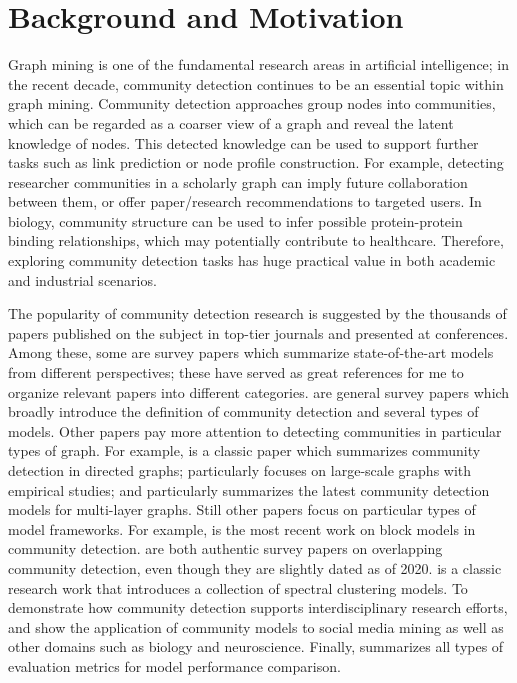 \section{Background and Motivation}
Graph mining is one of the fundamental research areas in artificial intelligence; in the recent decade, community detection continues to be an essential topic within graph mining. Community detection approaches group nodes into communities, which can be regarded as a coarser view of a graph and reveal the latent knowledge of nodes. This detected knowledge can be used to support further tasks such as link prediction or node profile construction. For example, detecting researcher communities in a scholarly graph can imply future collaboration between them, or offer paper/research recommendations to targeted users. In biology, community structure can be used to infer possible protein-protein binding relationships, which may potentially contribute to healthcare. Therefore, exploring community detection tasks has huge practical value in both academic and industrial scenarios.

The popularity of community detection research is suggested by the thousands of papers published on the subject in top-tier journals and presented at conferences. Among these, some are survey papers which summarize state-of-the-art models from different perspectives; these have served as great references for me to organize relevant papers into different categories. \cite{fortunato2010community, fortunato2016community, coscia2011classification} are general survey papers which broadly introduce the definition of community detection and several types of models. Other papers pay more attention to detecting communities in particular types of graph. For example, \cite{malliaros2013clustering} is a classic paper which summarizes community detection in directed graphs; \cite{harenberg2014community} particularly focuses on large-scale graphs with empirical studies; and \cite{kim2015community} particularly summarizes the latest community detection models for multi-layer graphs. Still other papers focus on particular types of model frameworks. For example, \cite{abbe2017community} is the most recent work on block models in community detection. \cite{xie2013overlapping,amelio2014overlapping} are both authentic survey papers on overlapping community detection, even though they are slightly dated as of 2020.  \cite{nascimento2011spectral} is a classic research work that introduces a collection of spectral clustering models. To demonstrate how community detection supports interdisciplinary research efforts, \cite{javed2018community} and \cite{bedi2016community} show the application of community models to social media mining as well as other domains such as biology and neuroscience. Finally, \cite{chakraborty2017metrics} summarizes all types of evaluation metrics for model performance comparison. 

